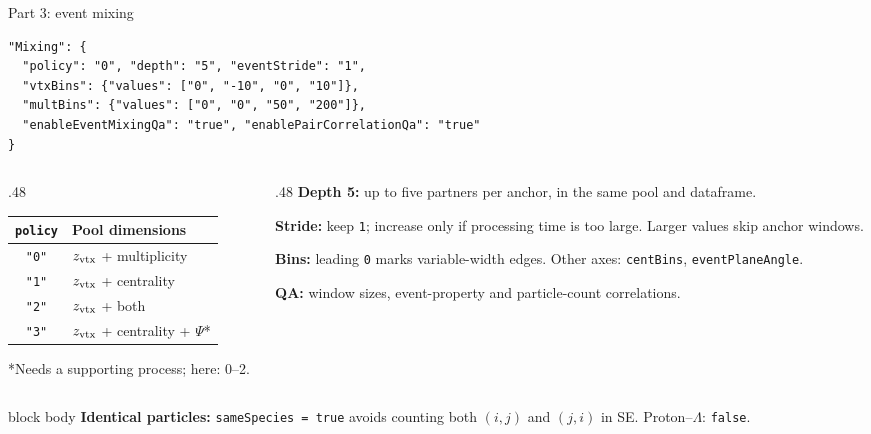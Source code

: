 \begin{frame}[fragile]{Part 3: event mixing}
 \footnotesize
 \begin{lstlisting}[basicstyle=\ttfamily\fontsize{7}{8}\selectfont]
"Mixing": {
  "policy": "0", "depth": "5", "eventStride": "1",
  "vtxBins": {"values": ["0", "-10", "0", "10"]},
  "multBins": {"values": ["0", "0", "50", "200"]},
  "enableEventMixingQa": "true", "enablePairCorrelationQa": "true"
}
 \end{lstlisting}
 \begin{columns}[T]
 \begin{column}{.48\textwidth}
 \begin{tabular}{cl}
 \toprule
 \texttt{policy} & Pool dimensions\\\midrule
 \texttt{"0"} & $z_{\rm vtx}$ + multiplicity\\
 \texttt{"1"} & $z_{\rm vtx}$ + centrality\\
 \texttt{"2"} & $z_{\rm vtx}$ + both\\
 \texttt{"3"} & $z_{\rm vtx}$ + centrality + $\Psi$*\\\bottomrule
 \end{tabular}
 \par\smallskip
 *Needs a supporting process; here: 0--2.
 \end{column}
 \begin{column}{.48\textwidth}
 \textbf{Depth 5:} up to five partners per anchor, in the same pool and dataframe.\par\smallskip
 \textbf{Stride:} keep \texttt{1}; increase only if processing time is too large. Larger values skip anchor windows.\par\smallskip
 \textbf{Bins:} leading \texttt{0} marks variable-width edges. Other axes: \texttt{centBins}, \texttt{eventPlaneAngle}.\par\smallskip
 \textbf{QA:} window sizes, event-property and particle-count correlations.
 \end{column}
 \end{columns}
 \begin{beamercolorbox}[sep=1mm,wd=\textwidth]{block body}
 \footnotesize\textbf{Identical particles:} \texttt{sameSpecies = true} avoids counting both $(i,j)$ and $(j,i)$ in SE. Proton--$\Lambda$: \texttt{false}.
 \end{beamercolorbox}
\end{frame}

